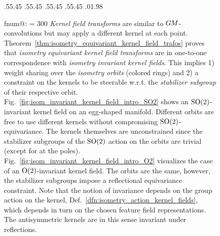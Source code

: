 \begin{figure}
        .55\textwidth .45\textwidth
        .55\textwidth .45\textwidth
        .55\textwidth .45\textwidth
        .55\textwidth .45\textwidth
        .01\textwidth .98\textwidth %
    \makeatletter
        {\protect{}}%
    \small %
    \csname fnum@\@captype\endcsname: %
    \makeatother
    \hyphenpenalty = 300 %
        \emph{Kernel field transforms} are similar to $G\mkern-1.4muM$-convolutions but may apply a different kernel at each point.
        Theorem~\ref{thm:isometry_equivariant_kernel_field_trafos} proves that \emph{isometry equivariant kernel field transforms} are in one-to-one correspondence with \emph{isometry invariant kernel fields}.
        This implies
        1) weight sharing over the \emph{isometry orbits} (colored rings) and
        2) a constraint on the kernels to be steerable w.r.t. the \emph{stabilizer subgroup} of their respective orbit.
        Fig.~\ref{fig:isom_invariant_kernel_field_intro_SO2} shows an $\operatorname{SO}(2)$-invariant kernel field on an egg-shaped manifold.
        Different orbits are free to use different kernels without compromising $\operatorname{SO}(2)$-equivariance.
        The kernels themselves are unconstrained since the stabilizer subgroups of the $\operatorname{SO}(2)$ action on the orbits are trivial (except for at the poles).
        Fig.~\ref{fig:isom_invariant_kernel_field_intro_O2} visualizes the case of an $\operatorname{O}(2)$-invariant kernel field.
        The orbits are the same, however, the stabilizer subgroups impose a reflectional equivariance constraint.
        Note that the notion of invariance depends on the group action on the kernel, Def.~\ref{dfn:isometry_action_kernel_fields}, which depends in turn on the chosen feature field representations.
        The antisymmetric kernels are in this sense invariant under reflections.
    \label{fig:isom_invariant_kernel_field_intro}
\end{figure}


